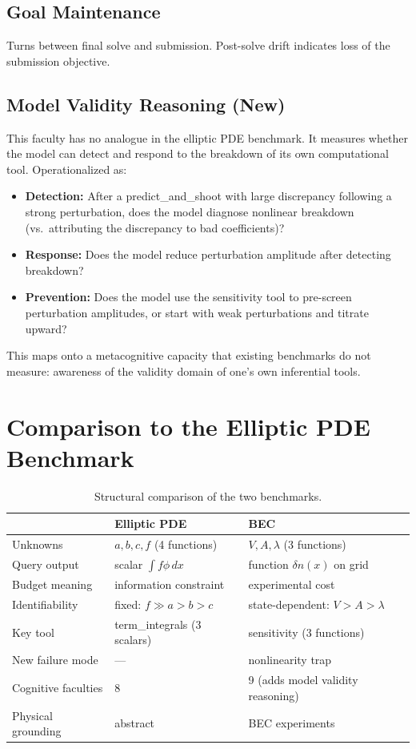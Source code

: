 \documentclass[11pt]{article}
\begin{document}
\subsection{Goal Maintenance}

Turns between final solve and submission. Post-solve drift indicates loss of the submission objective.

\subsection{Model Validity Reasoning (New)}

This faculty has no analogue in the elliptic PDE benchmark. It measures whether the model can detect and respond to the breakdown of its own computational tool. Operationalized as:
\begin{itemize}[leftmargin=2em]
\item \textbf{Detection:} After a predict\_and\_shoot with large discrepancy following a strong perturbation, does the model diagnose nonlinear breakdown (vs.\ attributing the discrepancy to bad coefficients)?
\item \textbf{Response:} Does the model reduce perturbation amplitude after detecting breakdown?
\item \textbf{Prevention:} Does the model use the sensitivity tool to pre-screen perturbation amplitudes, or start with weak perturbations and titrate upward?
\end{itemize}
This maps onto a metacognitive capacity that existing benchmarks do not measure: awareness of the validity domain of one's own inferential tools.

\section{Comparison to the Elliptic PDE Benchmark}

\begin{table}[h]
\centering
\small
\begin{tabular}{lll}
\toprule
& \textbf{Elliptic PDE} & \textbf{BEC} \\
\midrule
Unknowns & $a, b, c, f$ (4 functions) & $V, A, \lambda$ (3 functions) \\
Query output & scalar $\int f\phi\,dx$ & function $\delta n(x)$ on grid \\
Budget meaning & information constraint & experimental cost \\
Identifiability & fixed: $f \gg a > b > c$ & state-dependent: $V > A > \lambda$ \\
Key tool & term\_integrals (3 scalars) & sensitivity (3 functions) \\
New failure mode & --- & nonlinearity trap \\
Cognitive faculties & 8 & 9 (adds model validity reasoning) \\
Physical grounding & abstract & BEC experiments \\
\bottomrule
\end{tabular}
\caption{Structural comparison of the two benchmarks.}
\end{table}
\end{document}
